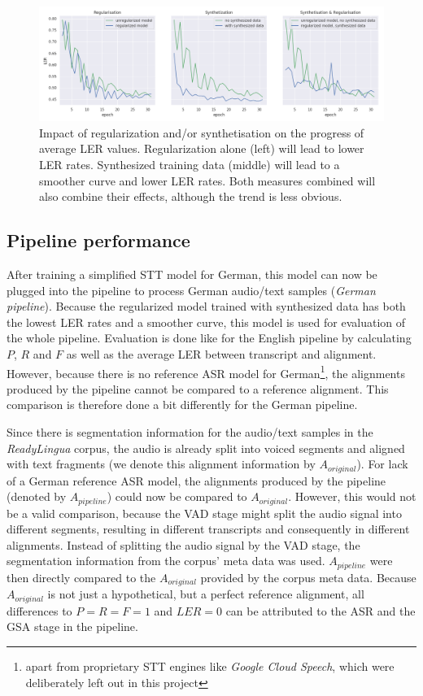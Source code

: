 \begin{figure}[h!]
	\includegraphics[width=\linewidth]{./img/regularization_synthetisation.png}
	\caption{Impact of regularization and/or synthetisation on the progress of average \ac{LER} values. Regularization alone (left) will lead to lower \ac{LER} rates. Synthesized training data (middle) will lead to a smoother curve and lower \ac{LER} rates. Both measures combined will also combine their effects, although the trend is less obvious.}
	\label{regularization_synthetisation}
\end{figure}

\subsection{Pipeline performance}

After training a simplified \ac{STT} model for German, this model can now be plugged into the pipeline to process German audio/text samples (\textit{German pipeline}). Because the regularized model trained with synthesized data has both the lowest \ac{LER} rates and a smoother curve, this model is used for evaluation of the whole pipeline. Evaluation is done like for the English pipeline by calculating $P$, $R$ and $F$ as well as the average \ac{LER} between transcript and alignment. However, because there is no reference \ac{ASR} model for German\footnote{apart from proprietary \ac{STT} engines like \textit{Google Cloud Speech}, which were deliberately left out in this project}, the alignments produced by the pipeline cannot be compared to a reference alignment. This comparison is therefore done a bit differently for the German pipeline.

Since there is segmentation information for the audio/text samples in the \textit{ReadyLingua} corpus, the audio is already split into voiced segments and aligned with text fragments (we denote this alignment information by $A_{original}$). For lack of a German reference \ac{ASR} model, the alignments produced by the pipeline (denoted by $A_{pipeline}$) could now be compared to $A_{original}$. However, this would not be a valid comparison, because the \ac{VAD} stage might split the audio signal into different segments, resulting in different transcripts and consequently in different alignments. Instead of splitting the audio signal by the \ac{VAD} stage, the segmentation information from the corpus' meta data was used. $A_{pipeline}$ were then directly compared to the $A_{original}$ provided by the corpus meta data. Because $A_{original}$ is not just a hypothetical, but a perfect reference alignment, all differences to $P=R=F=1$ and $LER=0$ can be attributed to the \ac{ASR} and the \ac{GSA} stage in the pipeline.

